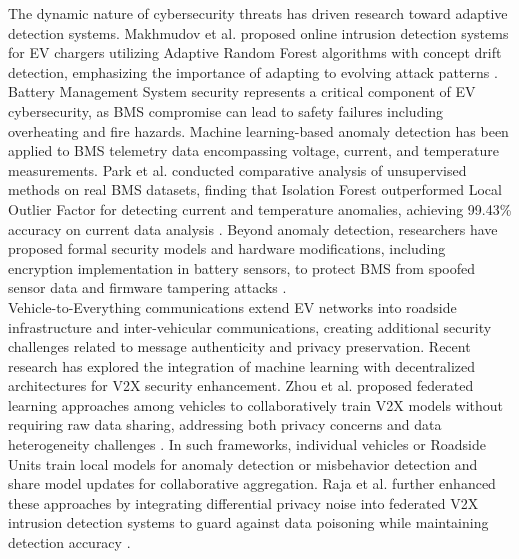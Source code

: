 The dynamic nature of cybersecurity threats has driven research toward adaptive detection systems. Makhmudov et al. proposed online intrusion detection systems for EV chargers utilizing Adaptive Random Forest algorithms with concept drift detection, emphasizing the importance of adapting to evolving attack patterns \cite{makhmudov2025online}. \\

Battery Management System security represents a critical component of EV cybersecurity, as BMS compromise can lead to safety failures including overheating and fire hazards. Machine learning-based anomaly detection has been applied to BMS telemetry data encompassing voltage, current, and temperature measurements. Park et al. conducted comparative analysis of unsupervised methods on real BMS datasets, finding that Isolation Forest outperformed Local Outlier Factor for detecting current and temperature anomalies, achieving 99.43\% accuracy on current data analysis \cite{lipu2023artificial}. Beyond anomaly detection, researchers have proposed formal security models and hardware modifications, including encryption implementation in battery sensors, to protect BMS from spoofed sensor data and firmware tampering attacks \cite{lipu2023artificial}. \\

Vehicle-to-Everything communications extend EV networks into roadside infrastructure and inter-vehicular communications, creating additional security challenges related to message authenticity and privacy preservation. Recent research has explored the integration of machine learning with decentralized architectures for V2X security enhancement. Zhou et al. proposed federated learning approaches among vehicles to collaboratively train V2X models without requiring raw data sharing, addressing both privacy concerns and data heterogeneity challenges \cite{sani2022privacy}. In such frameworks, individual vehicles or Roadside Units train local models for anomaly detection or misbehavior detection and share model updates for collaborative aggregation. Raja et al. further enhanced these approaches by integrating differential privacy noise into federated V2X intrusion detection systems to guard against data poisoning while maintaining detection accuracy \cite{javed2014adversarial}. \\

